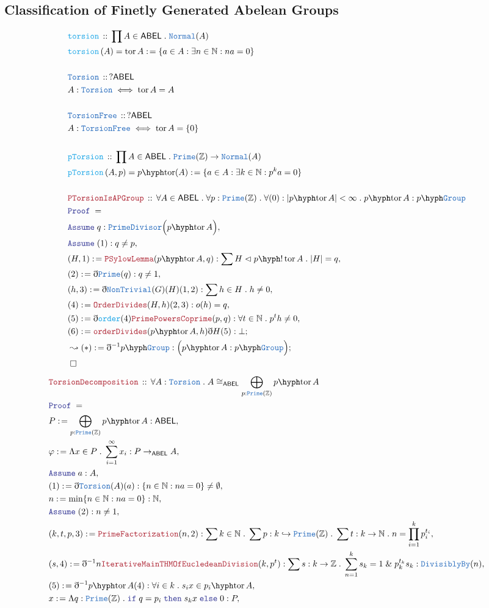 \documentclass[12pt]{scrartcl}
\newcommand{\TYPE}[1]{\textcolor{NavyBlue}{\mathtt{#1}}}
\newcommand{\FUNC}[1]{\textcolor{Cerulean}{\mathtt{#1}}}
\newcommand{\LOGIC}[1]{\textcolor{Blue}{\mathtt{#1}}}
\newcommand{\THM}[1]{\textcolor{Maroon}{\mathtt{#1}}}
\renewcommand{\.}{\; . \;}
\newcommand{\de}{: \kern 0.1pc =}
\newcommand{\If}{\LOGIC{if} \;}
\newcommand{\Then}{ \; \LOGIC{then} \;}
\newcommand{\Else}{\; \LOGIC{else} \;}
\newcommand{\Act}[1]{\left( #1 \right)}
\newcommand{\Theorem}[2]{& \THM{#1} \, :: \, #2 \\ & \Proof = \\ }
\newcommand{\DeclareType}[2]{& \TYPE{#1} \, :: \, #2 \\}
\newcommand{\DefineType}[3]{& #1 : \TYPE{#2} \iff #3 \\}
\newcommand{\DeclareFunc}[2]{& \FUNC{#1} \, :: \, #2 \\}
\newcommand{\DefineNamedFunc}[4]{&  \FUNC{#1}\Act{#2} = #3 \de #4 \\}
\newcommand{\Page}[1]{ \begin{align*} #1 \end{align*}   }
\newcommand{ \bd }{ \ByDef }
\renewcommand{\And}{\; \& \;}
\newcommand{\Int}{\mathbb{Z} }
\newcommand{\Nat}{\mathbb{N} }
\newcommand{\ToInj}{\hookrightarrow}
\newcommand{\Say}[3]{& #1 \de #2 : #3, \\}
\newcommand{\Conclude}[3]{& #1 \de #2 : #3; \\}
\newcommand{\DeriveConclude}[3]{& \leadsto #1 \de #2 : #3 ; \\}
\newcommand{\Assume}[2]{& \LOGIC{Assume} \; #1 : #2, \\}
\newcommand{\QED}{\; \square}
\newcommand{\EndProof}{& \QED \\}
\newcommand{\ByDef}{\eth}
\newcommand{\Proof}{\LOGIC{Proof} \; }
\newcommand{\Group}{\TYPE{Group}}
\newcommand{\Nrml}{\vartriangleleft}
\DeclareMathOperator{\tor}{tor}
\newcommand{\ABEL}{\mathsf{ABEL}}
\begin{document}
\subsection{Classification of Finetly Generated Abelean Groups}
\Page{
	\DeclareFunc{torsion}{\prod A \in \ABEL \. \TYPE{Normal}(A)}
	\DefineNamedFunc{torsion}{A}{\tor A}{ \{ a \in A : \exists n \in \Nat : na = 0 \} }
	\\
	\DeclareType{Torsion}{ ?\ABEL  }
	\DefineType{A}{Torsion}{ \tor A = A}
	\\
	\DeclareType{TorsionFree}{?\ABEL}
	\DefineType{A}{TorsionFree}{\tor A = \{0\}}
	\\
	\DeclareFunc{pTorsion}{\prod A \in \ABEL \. \TYPE{Prime}(\Int) \to \TYPE{Normal}(A)}
	\DefineNamedFunc{pTorsion}{A,p}{p\hyph\!\tor(A)}{ \{a \in A : \exists k \in \Nat : p^ka = 0 \} } 
	\\
	\Theorem{PTorsionIsAPGroup}{\forall A \in \ABEL \. \forall p : \TYPE{Prime}(\Int)  \. 
		\forall (0) : |p\hyph\!\tor A| < \infty \. p\hyph\!\tor A : p\hyph\Group}
	\Assume{q}{\TYPE{PrimeDivisor}\Big( p\hyph\!\tor A  \Big) }
	\Assume{(1)}{q \neq p}
	\Say{(H,1)}{\THM{PSylowLemma}(p\hyph\!\tor A, q)}{\sum H \Nrml p\hyph!\tor A \. |H| = q}
	\Say{(2)}{\bd \TYPE{Prime}(q)}{q \neq 1}
	\Say{(h,3)}{\bd \TYPE{NonTrivial}(G)(H)(1,2)}{\sum h \in H \. h \neq 0}
	\Say{(4)}{\THM{OrderDivides}(H,h)(2,3)}{ o(h) = q}
	\Say{(5)}{\bd \FUNC{order}(4)\THM{PrimePowersCoprime}(p,q)}{\forall t \in \Nat \. p^th \neq 0}
	\Conclude{(6)}{\THM{orderDivides}(p\hyph\!\tor A,h)\bd H (5)}{\bot}
	\DeriveConclude{(*)}{\bd^{-1} p\hyph\Group}{\Big( p\hyph\!\tor A :  p\hyph\Group  \Big)}
	\EndProof
}\Page{
	\Theorem{TorsionDecomposition}{\forall A : \TYPE{Torsion} \. A \cong_{\ABEL} 
		\bigoplus_{p : \TYPE{Prime}(\Int)} p\hyph\!\tor A  }
	\Say{P}{\bigoplus_{p : \TYPE{Prime}(\Int)} p\hyph\!\tor A}{\ABEL}
	\Say{\varphi}{\Lambda x \in P \. \sum^{\infty}_{i=1} x_i }{P \to_{\ABEL} A}
	\Assume{a}{A}
	\Say{(1)}{\bd \TYPE{Torsion}(A)(a)}{\{ n \in \Nat : na = 0\} \neq \emptyset}
	\Say{n}{\min \{ n \in \Nat : na = 0  \}}{\Nat}
	\Assume{(2)}{n \neq 1}
	\Say{(k,t,p,3)}{\THM{PrimeFactorization}(n,2)}{ \sum k \in \Nat \. \sum p : k \ToInj \TYPE{Prime}(\Int) \.
		\sum t : k \to \Nat \. n = \prod^k_{i=1} p_i^{t_i} }
	\Say{(s,4)}{\bd^{-1}n \THM{IterativeMainTHMOfEucledeanDivision}(k,p^t)}{\sum s : k \to \Int \. \sum^k_{n=1} s_k = 1 \And 
		p_k^{t_k}s_k : \TYPE{DivisiblyBy}(n)}
	\Say{(5)}{\bd^{-1} p\hyph\!\tor A (4)}{\forall i \in k \. s_ix \in p_i\hyph\!\tor A }
	\Say{x}{\Lambda q : \TYPE{Prime}(\Int) \. \If q = p_i \Then s_kx \Else 0 }{P}
}
\end{document}
